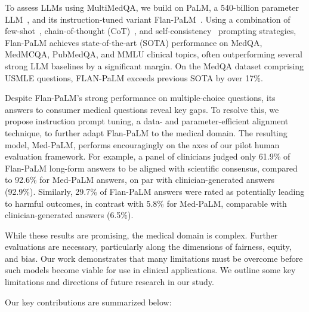 To assess LLMs using MultiMedQA, we build on PaLM, a 540-billion parameter LLM~\cite{chowdhery2022palm}, and its instruction-tuned variant Flan-PaLM~\cite{chung2022scaling}. Using a combination of few-shot~\cite{brown2020language}, chain-of-thought (CoT)~\cite{wei2022chain}, and self-consistency~\cite{wang2022self} prompting strategies, Flan-PaLM achieves state-of-the-art (SOTA) performance on MedQA, MedMCQA, PubMedQA, and MMLU clinical topics, often outperforming several strong LLM baselines by a significant margin. On the MedQA dataset comprising USMLE questions, FLAN-PaLM exceeds previous SOTA by over 17\%.

Despite Flan-PaLM's strong performance on multiple-choice questions, its answers to consumer medical questions reveal key gaps. To resolve this, we propose instruction prompt tuning, a data- and parameter-efficient alignment technique, to further adapt Flan-PaLM to the medical domain. The resulting model, Med-PaLM, performs encouragingly on the axes of our pilot human evaluation framework. For example, a panel of clinicians judged only 61.9\% of Flan-PaLM long-form answers to be aligned with scientific consensus, compared to 92.6\% for Med-PaLM answers, on par with clinician-generated answers (92.9\%). Similarly, 29.7\% of Flan-PaLM answers were rated as potentially leading to harmful outcomes, in contrast with 5.8\% for Med-PaLM, comparable with clinician-generated answers (6.5\%).

While these results are promising, the medical domain is complex. Further evaluations are necessary, particularly along the dimensions of fairness, equity, and bias. Our work demonstrates that many limitations must be overcome before such models become viable for use in clinical applications. We outline some key limitations and directions of future research in our study.

Our key contributions are summarized below:

